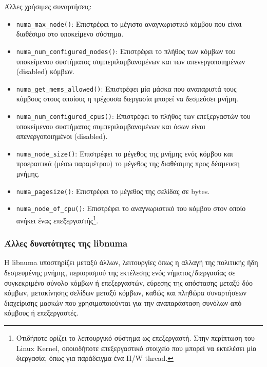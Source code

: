 \noindent Άλλες χρήσιμες συναρτήσεις:
\begin{itemize}
	\item \texttt{numa\_max\_node()}: Επιστρέφει το μέγιστο αναγνωριστικό κόμβου που είναι διαθέσιμο στο υποκείμενο σύστημα. 
	\item \texttt{numa\_num\_configured\_nodes()}: Επιστρέφει το πλήθος των κόμβων του υποκείμενου συστήματος συμπεριλαμβανομένων και των απενεργοποιημένων (disabled) κόμβων.
	\item \texttt{numa\_get\_mems\_allowed()}: Επιστρέφει μία μάσκα που αναπαριστά τους κόμβους στους οποίους  η τρέχουσα διεργασία μπορεί να δεσμεύσει μνήμη.
	\item \texttt{numa\_num\_configured\_cpus()}: Επιστρέφει το πλήθος των επεξεργαστών του υποκείμενου συστήματος συμπεριλαμβανομένων και όσων είναι απενεργοποιημένοι (disabled).
	\item \texttt{numa\_node\_size()}: Επιστρέφει το μέγεθος της μνήμης ενός κόμβου και προεραιτικά (μέσω παραμέτρου) το μέγεθος της διαθέσιμης προς δέσμευση μνήμης.
	\item \texttt{numa\_pagesize()}: Επιστρέφει το μέγεθος της σελίδας σε bytes.
	\item \texttt{numa\_node\_of\_cpu()}: Επιστρέφει το αναγνωριστικό του κόμβου στον οποίο ανήκει ένας επεξεργαστής\footnote{Ότιδήποτε ορίζει το λειτουργικό σύστημα ως επεξεργαστή. Στην περίπτωση του Linux Kernel, οποιοδήποτε επεξεργαστικό στοιχείο που μπορεί να εκτελέσει μία διεργασία, όπως για παράδειγμα ένα H/W thread.}.
\end{itemize}


\subsubsection{Άλλες δυνατότητες της libnuma}
Η libnuma υποστηρίζει μεταξύ άλλων, λειτουργίες όπως η αλλαγή της πολιτικής ήδη δεσμευμένης μνήμης, περιορισμού της εκτέλεσης ενός νήματος/διεργασίας σε συγκεκριμένο σύνολο κόμβων ή επεξεργαστών, εύρεσης της απόστασης μεταξύ δύο κόμβων, μετακίνησης σελίδων μεταξύ κόμβων, καθώς και πληθώρα συναρτήσεων διαχείρισης μασκών που χρησιμοποιούνται για την αναπαράσταση συνόλων από κόμβους ή επεξεργαστές.




